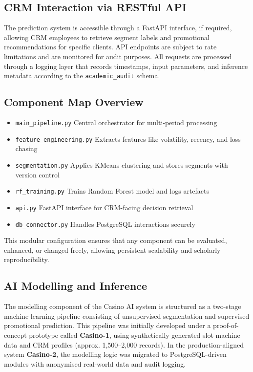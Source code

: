 \documentclass[12pt,a4paper]{report}
\begin{document}
\subsection{CRM Interaction via RESTful API}

The prediction system is accessible through a FastAPI interface, if required, allowing CRM employees to retrieve segment labels and promotional recommendations for specific clients.  API endpoints are subject to rate limitations and are monitored for audit purposes.  All requests are processed through a logging layer that records timestamps, input parameters, and inference metadata according to the  \texttt{academic\_audit} schema.

\subsection{Component Map Overview}

\begin{itemize}
    \item \texttt{main\_pipeline.py} \textendash{} Central orchestrator for multi-period processing
    \item \texttt{feature\_engineering.py} \textendash{} Extracts features like volatility, recency, and loss chasing
    \item \texttt{segmentation.py} \textendash{} Applies KMeans clustering and stores segments with version control
    \item \texttt{rf\_training.py} \textendash{} Trains Random Forest model and logs artefacts
    \item \texttt{api.py} \textendash{} FastAPI interface for CRM-facing decision retrieval
    \item \texttt{db\_connector.py} \textendash{} Handles PostgreSQL interactions securely
\end{itemize}

This modular configuration ensures that any component can be evaluated, enhanced, or changed freely, allowing persistent scalability and scholarly reproducibility.


\subsection{AI Modelling and Inference}
\label{sec:ai_modelling_inference}

The modelling component of the Casino AI system is structured as a two-stage machine learning pipeline consisting of unsupervised segmentation and supervised promotional prediction. This pipeline was initially developed under a proof-of-concept prototype called \textbf{Casino-1}, using synthetically generated slot machine data and CRM profiles (approx. 1,500–2,000 records). In the production-aligned system \textbf{Casino-2}, the modelling logic was migrated to PostgreSQL-driven modules with anonymised real-world data and audit logging.
\end{document}
